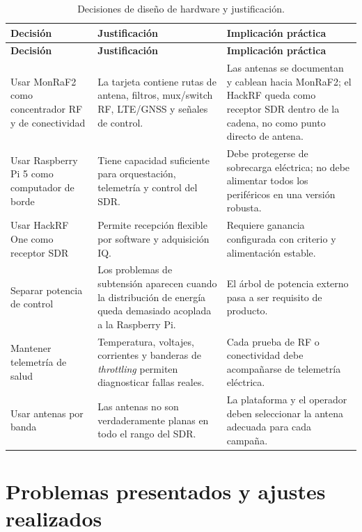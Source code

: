 \small
\begin{longtable}{p{3cm} p{4cm} p{5.2cm}}
\caption{Decisiones de diseño de hardware y justificación.}
\label{tab:hw_decisiones}\\
\toprule
\textbf{Decisión} & \textbf{Justificación} & \textbf{Implicación práctica} \\
\midrule
\endfirsthead
\toprule
\textbf{Decisión} & \textbf{Justificación} & \textbf{Implicación práctica} \\
\midrule
\endhead
Usar MonRaF2 como concentrador RF y de conectividad & La tarjeta contiene rutas de antena, filtros, mux/switch RF, LTE/GNSS y señales de control. & Las antenas se documentan y cablean hacia MonRaF2; el HackRF queda como receptor SDR dentro de la cadena, no como punto directo de antena. \\
Usar Raspberry Pi 5 como computador de borde & Tiene capacidad suficiente para orquestación, telemetría y control del SDR. & Debe protegerse de sobrecarga eléctrica; no debe alimentar todos los periféricos en una versión robusta. \\
Usar HackRF One como receptor SDR & Permite recepción flexible por software y adquisición IQ. & Requiere ganancia configurada con criterio y alimentación estable. \\
Separar potencia de control & Los problemas de subtensión aparecen cuando la distribución de energía queda demasiado acoplada a la Raspberry Pi. & El árbol de potencia externo pasa a ser requisito de producto. \\
Mantener telemetría de salud & Temperatura, voltajes, corrientes y banderas de \textit{throttling} permiten diagnosticar fallas reales. & Cada prueba de RF o conectividad debe acompañarse de telemetría eléctrica. \\
Usar antenas por banda & Las antenas no son verdaderamente planas en todo el rango del SDR. & La plataforma y el operador deben seleccionar la antena adecuada para cada campaña. \\
\bottomrule
\end{longtable}
\normalsize

\section{Problemas presentados y ajustes realizados}

